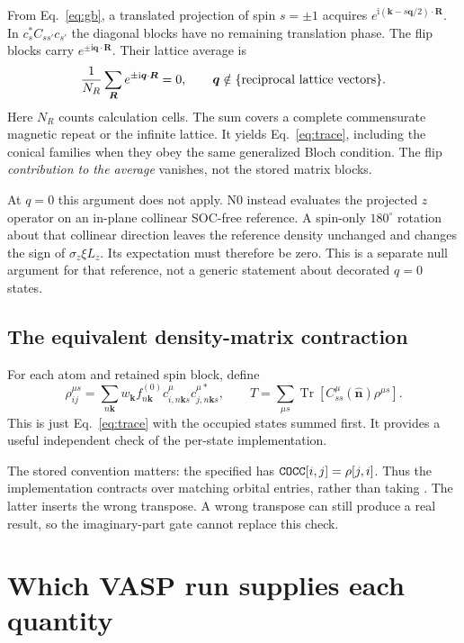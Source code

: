 \documentclass[11pt,a4paper]{article}
\numberwithin{equation}{section}
\newcommand{\vct}[1]{\bm{#1}}
\newcommand{\nh}{\hat{\vct n}}
\newcommand{\qh}{\vct q}
\newcommand{\kh}{\vct k}
\newcommand{\ii}{\mathrm i}
\newcommand{\Tr}{\operatorname{Tr}}
\newcommand{\code}[1]{\texttt{\detokenize{#1}}}
\begin{document}
From Eq.~\eqref{eq:gb}, a translated projection of spin $s=\pm1$ acquires
$e^{\ii(\kh-s\qh/2)\cdot\vct R}$. In $c_s^*C_{ss'}c_{s'}$ the diagonal
blocks have no remaining translation phase. The flip blocks carry
$e^{\pm\ii\qh\cdot\vct R}$. Their lattice average is
\begin{equation}\label{eq:average}
 \frac{1}{N_R}\sum_{\vct R}e^{\pm\ii\qh\cdot\vct R}=0,
 \qquad \qh\notin\{\hbox{reciprocal lattice vectors}\}.
\end{equation}
Here $N_R$ counts calculation cells. The sum covers a complete
commensurate magnetic repeat or the infinite lattice.
It yields Eq.~\eqref{eq:trace}, including the conical
families when they obey the same generalized Bloch condition. The flip
\emph{contribution to the average} vanishes, not the stored matrix blocks.

At $q=0$ this argument does not apply. N0 instead evaluates the projected
$z$ operator on an in-plane collinear SOC-free reference. A spin-only
$180^\circ$ rotation about that collinear direction leaves the reference
density unchanged and changes the sign of $\sigma_z\xi L_z$.
Its expectation must therefore be zero. This is a separate null argument
for that reference, not a generic statement about decorated $q=0$ states.

\subsection{The equivalent density-matrix contraction}

For each atom and retained spin block, define
\begin{equation}\label{eq:rho}
 \rho^{\mu s}_{ij}=
 \sum_{n\kh}w_{\kh}f^{(0)}_{n\kh}
 c^\mu_{i,n\kh s}c^{\mu *}_{j,n\kh s},\qquad
 T=\sum_{\mu s}\Tr[C^\mu_{ss}(\nh)\rho^{\mu s}].
\end{equation}
This is just Eq.~\eqref{eq:trace} with the occupied states summed first.
It provides a useful independent check of the per-state implementation.

The stored convention matters: the specified \code{COCC} has
$\code{COCC}[i,j]=\rho[j,i]$. Thus the implementation contracts
\code{sum(CSO * COCC)} over matching orbital entries, rather than taking
\code{trace(CSO @ COCC)}. The latter inserts the wrong transpose.
A wrong transpose can still produce a real result, so the imaginary-part
gate cannot replace this check.

\section{Which VASP run supplies each quantity}\label{sec:inputs}
\end{document}
